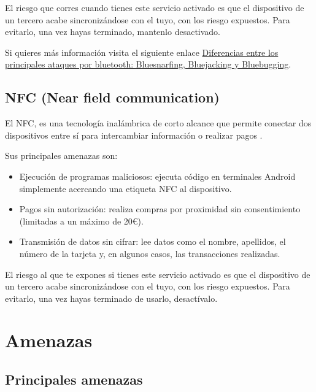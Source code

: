 \documentclass[
  spanish,
  a4paper,
  openany]{book}
\begin{document}
El riesgo que corres cuando tienes este servicio activado es que el dispositivo de un tercero acabe sincronizándose con el tuyo, con los riesgo expuestos. Para evitarlo, una vez hayas terminado, mantenlo desactivado.

Si quieres más información visita el siguiente enlace \href{https://computerhoy.com/noticias/tecnologia/diferencias-principales-ataques-bluetooth-bluesnarfing-bluejacking-bluebugging-1087867}{Diferencias entre los principales ataques por bluetooth: Bluesnarfing, Bluejacking y Bluebugging}.

\hypertarget{nfc-near-field-communication}{%
\section{NFC (Near field communication)}\label{nfc-near-field-communication}}

El NFC, es una tecnología inalámbrica de corto alcance que permite conectar dos dispositivos entre sí para intercambiar información o realizar pagos \citep{IONOS-nfc}.

Sus principales amenazas son:

\begin{itemize}
\item
  Ejecución de programas maliciosos: ejecuta código en terminales Android simplemente acercando una etiqueta NFC al dispositivo.
\item
  Pagos sin autorización: realiza compras por proximidad sin consentimiento (limitadas a un máximo de 20€).
\item
  Transmisión de datos sin cifrar: lee datos como el nombre, apellidos, el número de la tarjeta y, en algunos casos, las transacciones realizadas.
\end{itemize}

El riesgo al que te expones si tienes este servicio activado es que el dispositivo de un tercero acabe sincronizándose con el tuyo, con los riesgo expuestos. Para evitarlo, una vez hayas terminado de usarlo, desactívalo.

\hypertarget{amenazas}{%
\chapter{Amenazas}\label{amenazas}}

\hypertarget{principales-amenazas}{%
\section{Principales amenazas}\label{principales-amenazas}}
\end{document}

